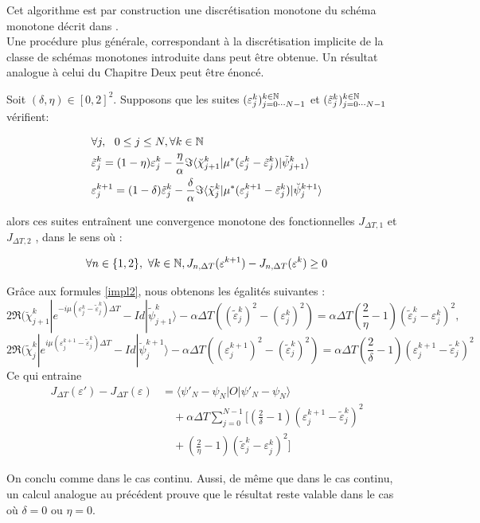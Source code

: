 Cet algorithme est par construction une discrétisation monotone du schéma monotone décrit dans \cite{Zhu}.\\

Une procédure plus générale, correspondant à la discrétisation implicite de la classe de schémas monotones introduite dans \cite{Maday} peut être obtenue. Un résultat analogue à celui du Chapitre Deux peut être énoncé.
\begin{theorem} \label{theoimpl}
	
	Soit $(\delta,\eta) \in [0,2]^2$. Supposons que les suites 
	$(\varepsilon_j^k)^{k\in\mathbb N}_{j = 0\cdots N-1}$ et $(\tilde{\varepsilon}_j^k)^{k\in\mathbb N}_{j = 0\cdots N-1}$ vérifient:
	
	\begin{align} \label{impl2}
	&\forall j, \ \ 0\leq j\leq N, \forall k \in \mathbb N \\ \nonumber
	&\tilde{\varepsilon}^k_j = (1-\eta)\varepsilon^k_j - \frac{\eta}{\alpha} \Im \langle  \breve{\chi}^k_{j+1}|\mu^*(\varepsilon^k_j-\tilde{\varepsilon}^k_j)|\tilde{\psi}^k_{j+1} \rangle\\
	&\varepsilon^{k+1}_j = (1-\delta)\tilde{\varepsilon}^k_j - \frac{\delta}{\alpha} \Im \langle  \tilde{\chi}^k_{j}|\mu^*(\varepsilon^{k+1}_j-\tilde{\varepsilon}^k_j)|\breve{\psi}^{k+1}_{j} \rangle \nonumber
	\end{align}
	
	alors ces suites entraînent une convergence monotone des fonctionnelles $J_{\Delta T,1}$ et $J_{\Delta T,2}$ , dans le sens où :
	
	$$ \forall n \in \{1,2\},\  \forall k \in \mathbb N, J_{n,\Delta T}(\varepsilon^{k+1}) - J_{n,\Delta T}(\varepsilon^k)\geq 0 $$
	
\end{theorem}

\begin{ proof }
Grâce aux formules \eqref{impl2}, nous obtenons les égalités suivantes :
$$
2\Re(\breve{\chi}^k_{j+1}|e^{-i\mu(\varepsilon^k_j-\tilde{\varepsilon}^k_j)\Delta T}-Id|\tilde{\psi}^k_{j+1}\rangle - \alpha \Delta T ((\tilde{\varepsilon}^k_j)^2-(\varepsilon^k_j)^2) = \alpha \Delta T (\frac{2}{\eta}-1)(\tilde{\varepsilon}_j^k - \varepsilon^k_j)^2,
$$
$$ 2\Re(\tilde{\chi}^k_j|e^{i\mu(\varepsilon^{k+1}_j-\tilde{\varepsilon}^k_j)\Delta T}-Id|\breve{\psi}^{k+1}_j\rangle - \alpha \Delta T ((\varepsilon^{k+1}_j)^2-(\tilde{\varepsilon}^k_j)^2)=\alpha \Delta T (\frac{2}{\delta}-1)(\varepsilon^{k+1}_j-\tilde{\varepsilon}^k_j)^2
$$
Ce qui entraine
\begin{align*}
J_{\Delta T}(\varepsilon')-J_{\Delta T}(\varepsilon) &= \langle \psi'_N-\psi_N |O|\psi'_N-\psi_N \rangle \\
&\quad +\alpha \Delta T \sum_{j=0}^{N -1}[(\frac{2}{\delta}-1)(\varepsilon^{k+1}_j-\tilde{\varepsilon}^k_j)^2\\
&\quad + (\frac{2}{\eta}-1)(\tilde{\varepsilon}_j^k - \varepsilon^k_j)^2]
\end{align*}
	
On conclu comme dans le cas continu. Aussi, de même que dans le cas continu, un calcul analogue au précédent prouve que le résultat reste valable dans le cas où $ \delta = 0$ ou $\eta = 0$.
\end{ proof }

